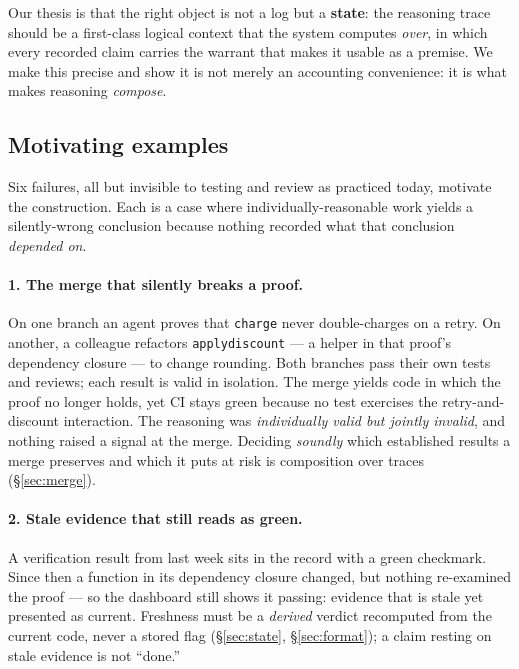 \documentclass[11pt]{article}
\newcommand{\codeus}{\textunderscore\penalty100\relax}
\newcommand{\code}[1]{\texttt{\let\_\codeus #1}}
\begin{document}
Our thesis is that the right object is not a log but a \textbf{state}: the reasoning trace should be a
first-class logical context that the system computes \emph{over}, in which every recorded claim carries the
warrant that makes it usable as a premise. We make this precise and show it is not merely an accounting
convenience: it is what makes reasoning \emph{compose}.

\subsection{Motivating examples}\label{sec:intro-examples}

Six failures, all but invisible to testing and review as practiced today, motivate the construction. Each is
a case where individually-reasonable work yields a silently-wrong conclusion because nothing recorded what
that conclusion \emph{depended on}.

\paragraph{1. The merge that silently breaks a proof.} On one branch an agent proves that \code{charge} never
double-charges on a retry. On another, a colleague refactors \code{apply\_discount} --- a helper in that
proof's dependency closure --- to change rounding. Both branches pass their own tests and reviews; each result
is valid in isolation. The merge yields code in which the proof no longer holds, yet CI stays green because no
test exercises the retry-and-discount interaction. The reasoning was \emph{individually valid but jointly
invalid}, and nothing raised a signal at the merge. Deciding \emph{soundly} which established results a merge
preserves and which it puts at risk is composition over traces (\S\ref{sec:merge}).

\paragraph{2. Stale evidence that still reads as green.} A verification result from last week sits in the
record with a green checkmark. Since then a function in its dependency closure changed, but nothing
re-examined the proof --- so the dashboard still shows it passing: evidence that is stale yet presented as
current. Freshness must be a \emph{derived} verdict recomputed from the current code, never a stored flag
(\S\ref{sec:state}, \S\ref{sec:format}); a claim resting on stale evidence is not ``done.''
\end{document}
